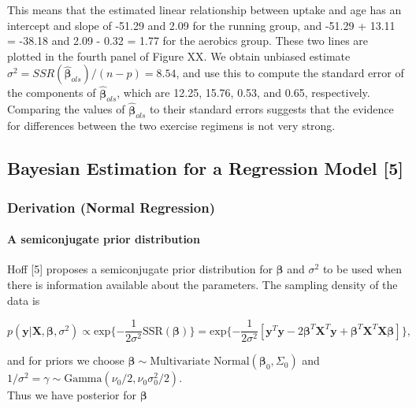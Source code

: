 \documentclass[12pt, a4paper]{article}
\begin{document}
\noindent This means that the estimated linear relationship between uptake and age has an intercept and slope of -51.29 and 2.09 for the running group, and -51.29 + 13.11 = -38.18 and 2.09 - 0.32 = 1.77 for the aerobics group.  These two lines are plotted in the fourth panel of Figure XX.  We obtain unbiased estimate $\sigma^2 = SSR(\hat{\boldsymbol\beta}_{ols})/(n-p) = 8.54$, and use this to compute the standard error of the components of $\hat{\boldsymbol\beta}_{ols}$, which are 12.25, 15.76, 0.53, and 0.65, respectively.  Comparing the values of $\hat{\boldsymbol\beta}_{ols}$ to their standard errors suggests that the evidence for differences between the two exercise regimens is not very strong.





\clearpage

  \subsection{Bayesian Estimation for a Regression Model [5]}

  \subsubsection{Derivation (Normal Regression)}

    \paragraph{A semiconjugate prior distribution}\label{normRegSemiconjugatePrior}
    Hoff [5] proposes a semiconjugate prior distribution for $\boldsymbol\beta$ and $\sigma^2$ to be used when there is information available about the parameters.  The sampling density of the data is

    $$p(\mathbf{y}|\mathbf{X},\boldsymbol\beta,\sigma^2) \propto \text{exp}\{-\frac{1}{2\sigma^2}\text{SSR}(\boldsymbol\beta)\} = \text{exp}\{-\frac{1}{2\sigma^2}[\mathbf{y}^T\mathbf{y} - 2\boldsymbol\beta^T\mathbf{X}^T\mathbf{y}+\boldsymbol\beta^T\mathbf{X}^T\mathbf{X}\boldsymbol\beta]\},$$

\noindent and for priors we choose $\boldsymbol\beta \sim \text{Multivariate Normal}(\boldsymbol\beta_0,\Sigma_0)$ and $1/\sigma^2 = \gamma\sim \text{Gamma}(\nu_0/2,\nu_0\sigma^2_0/2)$.  \\

\noindent Thus we have posterior for $\boldsymbol\beta$
\end{document}

